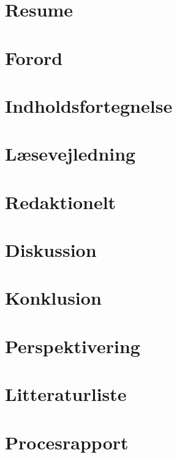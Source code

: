 \documentclass[12pt]{report}
\begin{document}



\chapter{Resume}



\chapter{Forord}

\newpage


\chapter{Indholdsfortegnelse}
\makeatletter
\renewcommand\tableofcontents{%
}
\makeatother
\tableofcontents
\pagebreak

\chapter{Læsevejledning}



\chapter{Redaktionelt}

\newpage








\chapter{Diskussion}



\chapter{Konklusion}



\chapter{Perspektivering}



\chapter{Litteraturliste}

\newpage


\chapter{Procesrapport}

\end{document}
